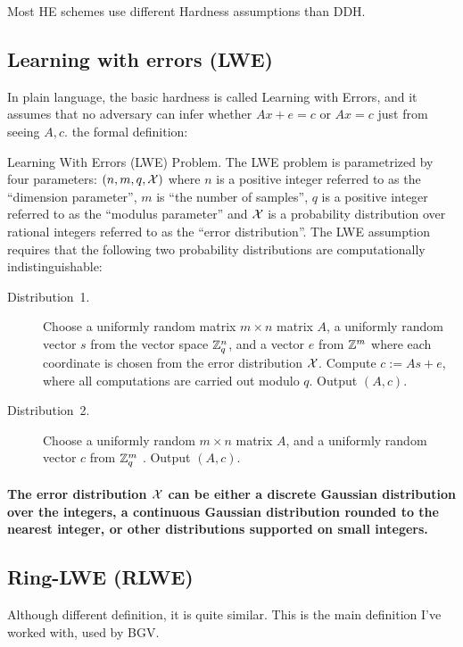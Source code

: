 Most HE schemes use different Hardness assumptions than DDH.

\subsection*{Learning with errors (LWE)}
In plain language, the basic hardness is called Learning with Errors,
and it assumes that no adversary can infer whether $Ax+e=c$ or $Ax=c$
just from seeing $A,c$. the formal definition:
\begin{defn}
Learning With Errors (LWE) Problem. The LWE problem is parametrized
by four parameters: $\left(n,m,q,\text{\ensuremath{\mathcal{X}}}\right)$
where $n$ is a positive integer referred to as the \textquotedblleft dimension
parameter\textquotedblright , $m$ is \textquotedblleft the number
of samples\textquotedblright , $q$ is a positive integer referred
to as the \textquotedblleft modulus parameter\textquotedblright{}
and $\mathcal{X}$ is a probability distribution over rational integers referred
to as the \textquotedblleft error distribution\textquotedblright .
The LWE assumption requires that the following two probability distributions
are computationally indistinguishable: 
\begin{description}
\item [{Distribution~1.}] Choose a uniformly random matrix $m\times n$
matrix $A$, a uniformly random vector $s$ from the vector space
$\mathbb{Z}_{q}^{n}$, and a vector $e$ from $\mathbb{Z}^{m}$ where each coordinate
is chosen from the error distribution $\mathcal{X}$. Compute $c:=As+e$,
where all computations are carried out modulo $q$. Output $\left(A,c\right)$. 
\item [{Distribution~2.}] Choose a uniformly random $m\times n$ matrix
$A$, and a uniformly random vector $c$ from $\mathbb{Z}_{q}^{m}$ . Output
$\left(A,c\right)$. 
\end{description}

\paragraph{The error distribution $\protect\mathcal{X}$ can be either a discrete Gaussian
distribution over the integers, a continuous Gaussian distribution
rounded to the nearest integer, or other distributions supported on
small integers.}
\end{defn}

\subsection*{Ring-LWE (RLWE)} Although different definition, it is quite similar.
This is the main definition I've worked with, used by BGV.

